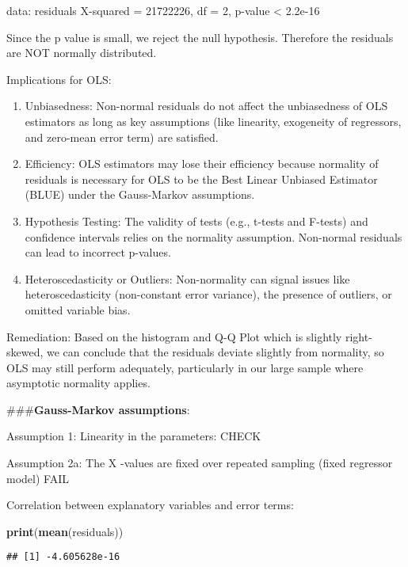\documentclass[
]{article}
\newenvironment{Shaded}{\begin{snugshade}}{\end{snugshade}}
\newcommand{\FunctionTok}[1]{\textcolor[rgb]{0.13,0.29,0.53}{\textbf{#1}}}
\newcommand{\NormalTok}[1]{#1}
\begin{document}
data: residuals X-squared = 21722226, df = 2, p-value \textless{}
2.2e-16

Since the p value is small, we reject the null hypothesis. Therefore the
residuals are NOT normally distributed.

Implications for OLS:

\begin{enumerate}
\def\labelenumi{\arabic{enumi})}
\item
  Unbiasedness: Non-normal residuals do not affect the unbiasedness of
  OLS estimators as long as key assumptions (like linearity, exogeneity
  of regressors, and zero-mean error term) are satisfied.
\item
  Efficiency: OLS estimators may lose their efficiency because normality
  of residuals is necessary for OLS to be the Best Linear Unbiased
  Estimator (BLUE) under the Gauss-Markov assumptions.
\item
  Hypothesis Testing: The validity of tests (e.g., t-tests and F-tests)
  and confidence intervals relies on the normality assumption.
  Non-normal residuals can lead to incorrect p-values.
\item
  Heteroscedasticity or Outliers: Non-normality can signal issues like
  heteroscedasticity (non-constant error variance), the presence of
  outliers, or omitted variable bias.
\end{enumerate}

Remediation: Based on the histogram and Q-Q Plot which is slightly
right-skewed, we can conclude that the residuals deviate slightly from
normality, so OLS may still perform adequately, particularly in our
large sample where asymptotic normality applies.

\#\#\#\textbf{Gauss-Markov assumptions}:

Assumption 1: Linearity in the parameters: CHECK

Assumption 2a: The X -values are fixed over repeated sampling (fixed
regressor model) FAIL

Correlation between explanatory variables and error terms:

\begin{Shaded}
\begin{Highlighting}[]
\FunctionTok{print}\NormalTok{(}\FunctionTok{mean}\NormalTok{(residuals))}
\end{Highlighting}
\end{Shaded}

\begin{verbatim}
## [1] -4.605628e-16
\end{verbatim}
\end{document}
